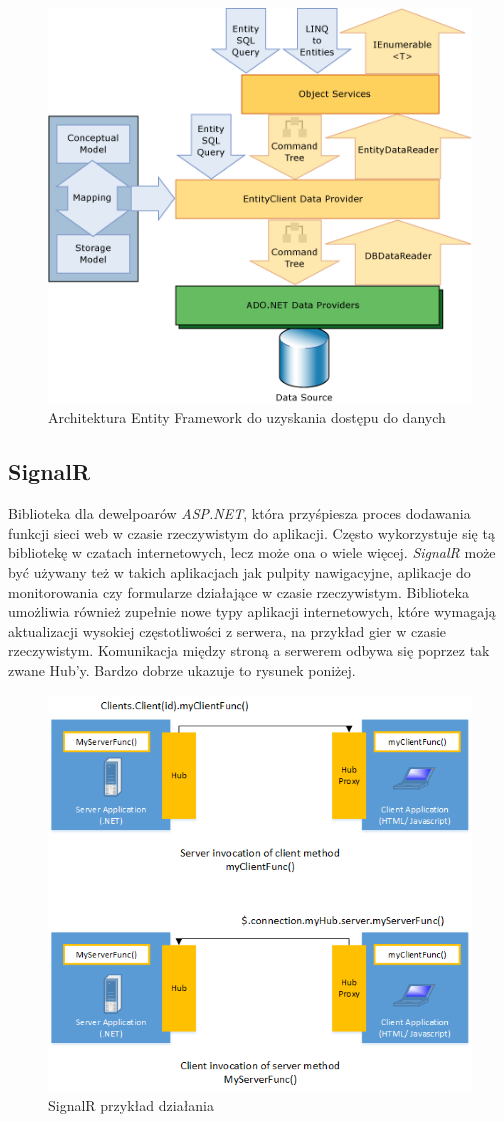 \documentclass[12pt,a4paper]{article}
\begin{document}
\begin{figure}[H]
	\centering
	\includegraphics[width=0.7\linewidth]{entity}
	\caption{Architektura Entity Framework do uzyskania dostępu do danych}
	\label{fig:entity}
\end{figure}


\subsection{SignalR} 			%

\hspace*{0.7cm} Biblioteka dla dewelpoarów \textit{ASP.NET}, która przyśpiesza proces dodawania funkcji sieci web w czasie rzeczywistym do aplikacji. Często wykorzystuje się tą bibliotekę w czatach internetowych, lecz może ona o wiele więcej. \textit{SignalR} może być używany też w takich aplikacjach jak pulpity nawigacyjne, aplikacje do monitorowania czy formularze działające w czasie rzeczywistym. Biblioteka umożliwia również zupełnie nowe typy aplikacji internetowych, które wymagają aktualizacji wysokiej częstotliwości z serwera, na przykład gier w czasie rzeczywistym.
Komunikacja między stroną a serwerem odbywa się poprzez tak zwane Hub'y. Bardzo dobrze ukazuje to rysunek poniżej. \newline

\begin{figure}[H]
	\centering
	\includegraphics[width=0.7\linewidth]{signalr}
	\caption{SignalR przykład działania}
	\label{fig:signalr}
\end{figure}
\end{document}
